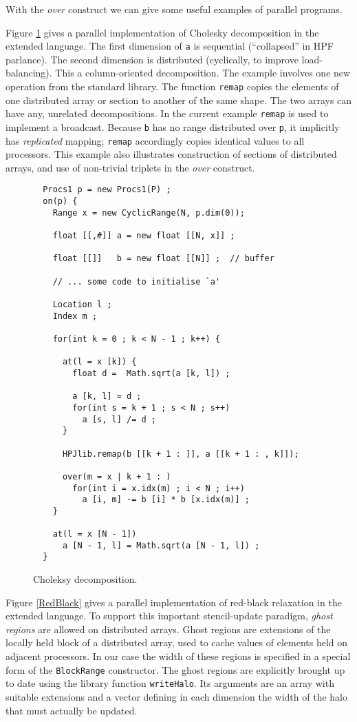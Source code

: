 With the {\em over} construct we can give some useful
examples of parallel programs.

Figure \ref{Cholesky} gives a parallel implementation
of Cholesky decomposition in the extended language.
The first dimension of {\tt a} is sequential (``collapsed''
in HPF parlance).  The second dimension is distributed (cyclically,
to improve load-balancing).  This a column-oriented decomposition.
The example involves one new operation from
the standard library.  The function {\tt remap} copies the elements
of one distributed array or section to another of the same shape.
The two arrays can have any, unrelated decompositions.
In the current example {\tt remap} is used to implement a broadcast.
Because {\tt b} has no range distributed over {\tt p},
it implicitly has {\em replicated} mapping; {\tt remap} accordingly
copies identical values to all processors.  This example also
illustrates construction of sections of distributed arrays, and use of
non-trivial triplets in the {\em over} construct.

\begin{figure}[btp]
\small
\begin{verbatim}
  Procs1 p = new Procs1(P) ;
  on(p) {
    Range x = new CyclicRange(N, p.dim(0));

    float [[,#]] a = new float [[N, x]] ;

    float [[]]   b = new float [[N]] ;  // buffer

    // ... some code to initialise `a'

    Location l ;
    Index m ;

    for(int k = 0 ; k < N - 1 ; k++) {

      at(l = x [k]) {
        float d =  Math.sqrt(a [k, l]) ;

        a [k, l] = d ;
        for(int s = k + 1 ; s < N ; s++)
          a [s, l] /= d ;
      }

      HPJlib.remap(b [[k + 1 : ]], a [[k + 1 : , k]]);

      over(m = x | k + 1 : )
        for(int i = x.idx(m) ; i < N ; i++)
          a [i, m] -= b [i] * b [x.idx(m)] ;
    }

    at(l = x [N - 1])
      a [N - 1, l] = Math.sqrt(a [N - 1, l]) ;
  }
\end{verbatim}
\normalsize
\caption{\label{Cholesky}Choleksy decomposition.}
\end{figure}

Figure \ref{RedBlack} gives a parallel implementation of red-black
relaxation in the extended language.  To support this important
stencil-update paradigm, {\em ghost regions} are allowed on
distributed arrays.  Ghost regions are extensions of the locally held
block of a distributed array, used to cache values of elements held on
adjacent processors.  In our case the width of these regions is
specified in a special form of the {\tt BlockRange} constructor.  The
ghost regions are explicitly brought up to date using the library
function {\tt writeHalo}.  Its arguments are an array with suitable
extensions and a vector defining in each dimension the width of the
halo that must actually be updated.

